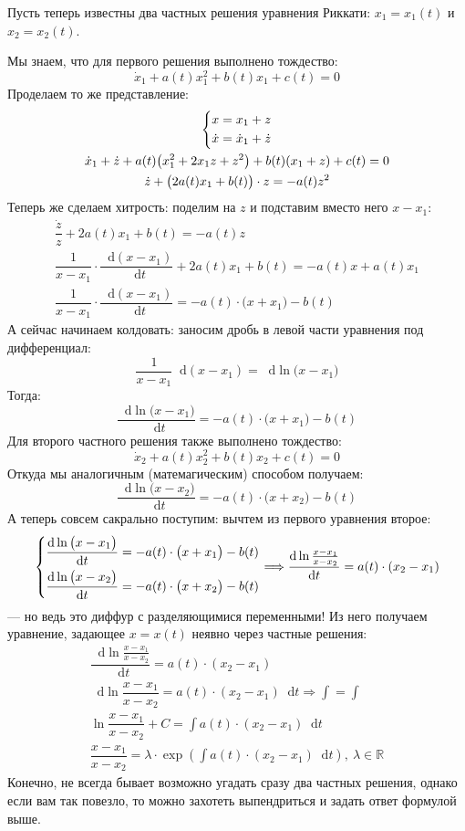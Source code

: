 \documentclass[a4paper,12pt]{article}
\newcommand{\R}{\mathbb{R}}
\renewcommand*\d{\mathop{}\!\mathrm{d}}
\newcommand{\dx}{\dot{x}}
\newcommand{\dz}{\dot{z}}
\newcommand{\ds}{\displaystyle}
\begin{document}
Пусть теперь известны два частных решения уравнения Риккати: $x_1 = x_1(t)$ и $x_2 = x_2(t)$.

Мы знаем, что для первого решения выполнено тождество:
\[\dx_1 + a(t)x_1^2 + b(t)x_1 + c(t) = 0\]
Проделаем то же представление:
\begin{gather*}
\left\{\begin{gathered}
x = x_1 + z\hfill\\
\dx = \dx_1 + \dz\hfill
\end{gathered}\right.\\
\dx_1 + \dz + a(t)\big(x_1^2  + 2x_1z + z^2\big) + b(t)(x_1 + z) + c(t) = 0\\
\dz + \big(2a(t)x_1 + b(t)\big) \cdot z = -a(t)z^2
\end{gather*}
Теперь же сделаем хитрость: поделим на $z$ и подставим вместо него $x - x_1$:
\begin{gather*}
\dfrac{\dz}{z} + 2a(t)x_1 + b(t) = -a(t)z\\
\dfrac{1}{x - x_1}\cdot\dfrac{\d (x - x_1)}{\d t} + 2a(t)x_1 + b(t) = -a(t)x + a(t)x_1\\
\dfrac{1}{x - x_1}\cdot\dfrac{\d (x - x_1)}{\d t} = -a(t)\cdot \big(x + x_1\big) - b(t)
\end{gather*}
А сейчас начинаем колдовать: заносим дробь в левой части уравнения под дифференциал:
\[\dfrac{1}{x - x_1}\d (x - x_1) = \d \ln\big(x - x_1\big)\]\newpage
Тогда:
\[
\dfrac{\d \ln\big(x - x_1\big)}{\d t} = -a(t)\cdot \big(x + x_1\big) - b(t)
\]
Для второго частного решения также выполнено тождество:
\[\dx_2 + a(t)x_2^2 + b(t)x_2 + c(t) = 0\]
Откуда мы аналогичным (матемагическим) способом получаем:
\[\dfrac{\d \ln\big(x - x_2\big)}{\d t} = -a(t)\cdot \big(x + x_2\big) - b(t)\]
А теперь совсем сакрально поступим: вычтем из первого уравнения второе:
\[\left\{\begin{gathered}
\dfrac{\d \ln\big(x - x_1\big)}{\d t} = -a(t)\cdot \big(x + x_1\big) - b(t)\hfill\\
\dfrac{\d \ln\big(x - x_2\big)}{\d t} = -a(t)\cdot \big(x + x_2\big) - b(t) \hfill
\end{gathered}\right. \Longrightarrow \dfrac{\d \ln\frac{x - x_1}{x - x_2}}{\d t} = a(t)\cdot (x_2 - x_1)\] --- но ведь это диффур с разделяющимися переменными! Из него получаем уравнение, задающее $x = x(t)$ неявно через частные решения:
\begin{gather*}
\dfrac{\d \ln\frac{x - x_1}{x - x_2}}{\d t} = a(t)\cdot (x_2 - x_1) \\
\d \ln\dfrac{x - x_1}{x - x_2} = a(t)\cdot (x_2 - x_1)\d t \Longrightarrow \ds\int = \int\\
\ln\dfrac{x - x_1}{x - x_2} + C = \ds\int a(t)\cdot (x_2 - x_1)\d t\\
\dfrac{x - x_1}{x - x_2} = \lambda \cdot \exp(\ds\int a(t)\cdot (x_2 - x_1)\d t),\ \lambda \in \R
\end{gather*}
Конечно, не всегда бывает возможно угадать сразу два частных решения, однако если вам так повезло, то можно захотеть выпендриться и задать ответ формулой выше.
\ \\
\end{document}
